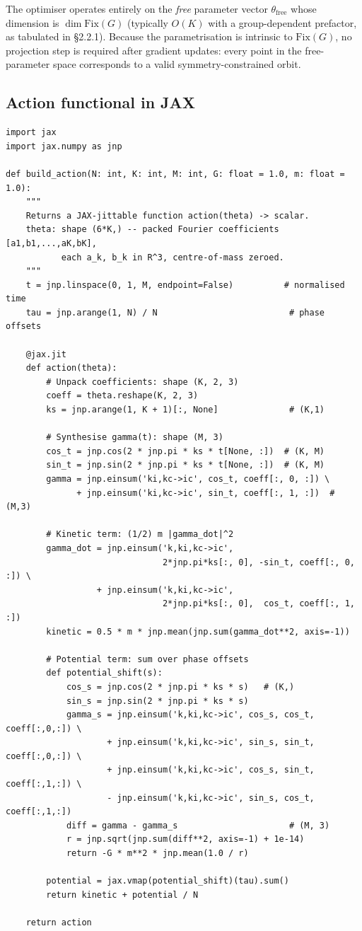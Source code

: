 \documentclass[12pt, a4paper]{article}
\theoremstyle{definition}
\newcommand{\Fix}{\mathrm{Fix}}
\begin{document}
The optimiser operates entirely on the \emph{free} parameter vector
$\theta_{\mathrm{free}}$ whose dimension is $\dim\Fix(G)$ (typically $O(K)$
with a group-dependent prefactor, as tabulated in §2.2.1).  Because the
parametrisation is intrinsic to $\Fix(G)$, no projection step is required
after gradient updates: every point in the free-parameter space corresponds
to a valid symmetry-constrained orbit.

\subsection{Action functional in JAX}

\begin{lstlisting}[style=python, caption={Core action functional (JAX).}]
import jax
import jax.numpy as jnp

def build_action(N: int, K: int, M: int, G: float = 1.0, m: float = 1.0):
    """
    Returns a JAX-jittable function action(theta) -> scalar.
    theta: shape (6*K,) -- packed Fourier coefficients [a1,b1,...,aK,bK],
           each a_k, b_k in R^3, centre-of-mass zeroed.
    """
    t = jnp.linspace(0, 1, M, endpoint=False)          # normalised time
    tau = jnp.arange(1, N) / N                          # phase offsets

    @jax.jit
    def action(theta):
        # Unpack coefficients: shape (K, 2, 3)
        coeff = theta.reshape(K, 2, 3)
        ks = jnp.arange(1, K + 1)[:, None]              # (K,1)

        # Synthesise gamma(t): shape (M, 3)
        cos_t = jnp.cos(2 * jnp.pi * ks * t[None, :])  # (K, M)
        sin_t = jnp.sin(2 * jnp.pi * ks * t[None, :])  # (K, M)
        gamma = jnp.einsum('ki,kc->ic', cos_t, coeff[:, 0, :]) \
              + jnp.einsum('ki,kc->ic', sin_t, coeff[:, 1, :])  # (M,3)

        # Kinetic term: (1/2) m |gamma_dot|^2
        gamma_dot = jnp.einsum('k,ki,kc->ic',
                               2*jnp.pi*ks[:, 0], -sin_t, coeff[:, 0, :]) \
                  + jnp.einsum('k,ki,kc->ic',
                               2*jnp.pi*ks[:, 0],  cos_t, coeff[:, 1, :])
        kinetic = 0.5 * m * jnp.mean(jnp.sum(gamma_dot**2, axis=-1))

        # Potential term: sum over phase offsets
        def potential_shift(s):
            cos_s = jnp.cos(2 * jnp.pi * ks * s)   # (K,)
            sin_s = jnp.sin(2 * jnp.pi * ks * s)
            gamma_s = jnp.einsum('k,ki,kc->ic', cos_s, cos_t, coeff[:,0,:]) \
                    + jnp.einsum('k,ki,kc->ic', sin_s, sin_t, coeff[:,0,:]) \
                    + jnp.einsum('k,ki,kc->ic', cos_s, sin_t, coeff[:,1,:]) \
                    - jnp.einsum('k,ki,kc->ic', sin_s, cos_t, coeff[:,1,:])
            diff = gamma - gamma_s                      # (M, 3)
            r = jnp.sqrt(jnp.sum(diff**2, axis=-1) + 1e-14)
            return -G * m**2 * jnp.mean(1.0 / r)

        potential = jax.vmap(potential_shift)(tau).sum()
        return kinetic + potential / N

    return action
\end{lstlisting}
\end{document}
